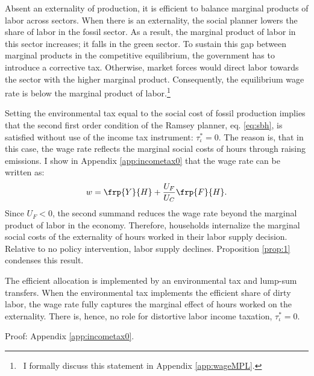 Absent an externality of production, it is efficient to balance marginal products of labor across sectors.
When there is an externality, the social planner lowers the share of labor in the fossil sector. As a result, the marginal product of labor in this sector increases; it falls in the green sector. To sustain this gap between marginal products in the competitive equilibrium, the government has to introduce a corrective tax. Otherwise, market forces would direct labor towards the sector with the higher marginal product. Consequently, the equilibrium wage rate is below the marginal product of labor.\footnote{\ I formally discuss this statement in Appendix \ref{app:wageMPL}.} 

Setting the environmental tax equal to the social cost of fossil production implies that the second first order condition of the Ramsey planner, eq. \eqref{eq:sbh}, is satisfied without use of the income tax instrument: $\tau_{\iota}^*=0$. 
The reason is, that in this case, the wage rate reflects the marginal social costs of hours through raising emissions. I show in Appendix \ref{app:incometax0} that the wage rate can be written as:
\begin{align*}
w = \frp{Y}{H}+\frac{U_F}{U_C}\frp{F}{H}.
\end{align*}
Since $U_F<0$, the second summand reduces the wage rate beyond the marginal product of labor in the economy.
Therefore, households internalize the marginal social costs of the externality of hours worked in their labor supply decision. Relative to no policy intervention, labor supply declines. Proposition \ref{prop:1} condenses this result.

\newpage 
\begin{prop}\label{prop:1}
	The efficient allocation is implemented by an environmental tax and lump-sum transfers.  When the environmental tax implements the efficient share of dirty labor, the wage rate fully captures the marginal effect of hours worked on the externality. There is, hence, no role for distortive labor income taxation, $\tau_{\iota}^*=0$.
\end{prop}
Proof: Appendix \ref{app:incometax0}. 



